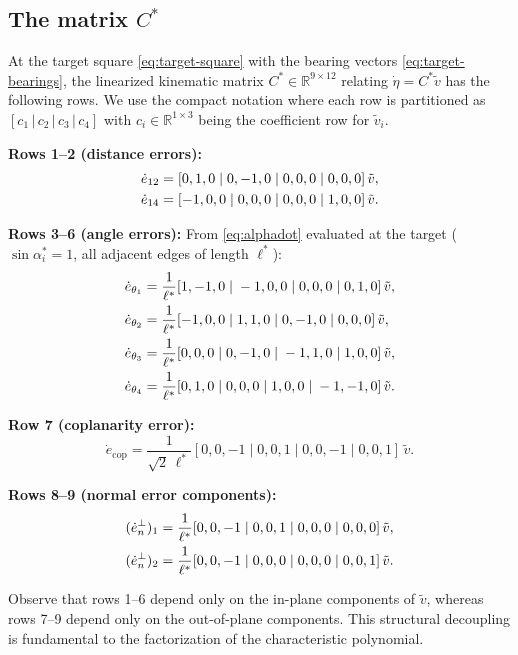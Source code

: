 \documentclass[letterpaper,journal]{IEEEtran}
\theoremstyle{plain}
\theoremstyle{definition}
\theoremstyle{remark}
\begin{document}
\subsection{The matrix \(C^*\)}
\label{app:Cstar}

At the target square \eqref{eq:target-square} with the bearing vectors \eqref{eq:target-bearings}, the linearized kinematic matrix \(C^*\in\mathbb R^{9\times 12}\) relating \(\dot\eta=C^*\tilde v\) has the following rows. We use the compact notation where each row is partitioned as \([c_1\,|\,c_2\,|\,c_3\,|\,c_4]\) with \(c_i\in\mathbb R^{1\times 3}\) being the coefficient row for \(\tilde v_i\).

\noindent\textbf{Rows 1--2 (distance errors):}
\begin{align}
\dot e_{12}&=[0,1,0\;|\;0,-1,0\;|\;0,0,0\;|\;0,0,0]\,\tilde v,\\
\dot e_{14}&=[-1,0,0\;|\;0,0,0\;|\;0,0,0\;|\;1,0,0]\,\tilde v.\notag
\end{align}

\noindent\textbf{Rows 3--6 (angle errors):} From \eqref{eq:alphadot} evaluated at the target (\(\sin\alpha_i^*=1\), all adjacent edges of length \(\ell^*\)):
\begin{align}
\dot e_{\theta_1}&=\frac{1}{\ell^*}[1,-1,0\;|\;-1,0,0\;|\;0,0,0\;|\;0,1,0]\,\tilde v,\\
\dot e_{\theta_2}&=\frac{1}{\ell^*}[-1,0,0\;|\;1,1,0\;|\;0,-1,0\;|\;0,0,0]\,\tilde v,\notag\\
\dot e_{\theta_3}&=\frac{1}{\ell^*}[0,0,0\;|\;0,-1,0\;|\;-1,1,0\;|\;1,0,0]\,\tilde v,\notag\\
\dot e_{\theta_4}&=\frac{1}{\ell^*}[0,1,0\;|\;0,0,0\;|\;1,0,0\;|\;-1,-1,0]\,\tilde v.\notag
\end{align}

\noindent\textbf{Row 7 (coplanarity error):}
\begin{equation}
\dot e_{\mathrm{cop}}=\frac{1}{\sqrt2\,\ell^*}[0,0,-1\;|\;0,0,1\;|\;0,0,-1\;|\;0,0,1]\,\tilde v.
\end{equation}

\noindent\textbf{Rows 8--9 (normal error components):}
\begin{align}
(\dot e_n^\perp)_1&=\frac{1}{\ell^*}[0,0,-1\;|\;0,0,1\;|\;0,0,0\;|\;0,0,0]\,\tilde v,\\
(\dot e_n^\perp)_2&=\frac{1}{\ell^*}[0,0,-1\;|\;0,0,0\;|\;0,0,0\;|\;0,0,1]\,\tilde v.\notag
\end{align}

Observe that rows 1--6 depend only on the in-plane components of \(\tilde v\), whereas rows 7--9 depend only on the out-of-plane components. This structural decoupling is fundamental to the factorization of the characteristic polynomial.
\end{document}
